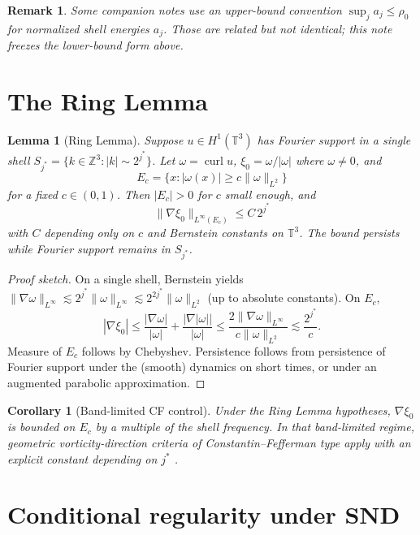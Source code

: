 \documentclass[11pt]{article}
\newtheorem{lemma}[theorem]{Lemma}
\newtheorem{corollary}[theorem]{Corollary}
\newtheorem{remark}[theorem]{Remark}
\begin{document}
\begin{remark}
Some companion notes use an upper-bound convention $\sup_j a_j\le\rho_0$ for normalized
shell energies $a_j$. Those are related but not identical; this note freezes the
lower-bound form above.
\end{remark}

\section{The Ring Lemma}

\begin{lemma}[Ring Lemma]
Suppose $u\in H^1(\mathbb{T}^3)$ has Fourier support in a single shell
$S_{j^*}=\{k\in\mathbb{Z}^3:|k|\sim 2^{j^*}\}$. Let $\omega=\operatorname{curl}u$,
$\xi_0=\omega/|\omega|$ where $\omega\neq 0$, and
\[
E_c=\{x:|\omega(x)|\ge c\|\omega\|_{L^2}\}
\]
for a fixed $c\in(0,1)$. Then $|E_c|>0$ for $c$ small enough, and
\[
\|\nabla\xi_0\|_{L^\infty(E_c)}\le C\,2^{j^*}
\]
with $C$ depending only on $c$ and Bernstein constants on $\mathbb{T}^3$.
The bound persists while Fourier support remains in $S_{j^*}$.
\end{lemma}

\begin{proof}[Proof sketch]
On a single shell, Bernstein yields
$\|\nabla\omega\|_{L^\infty}\lesssim 2^{j^*}\|\omega\|_{L^\infty}
\lesssim 2^{2j^*}\|\omega\|_{L^2}$ (up to absolute constants).
On $E_c$,
\[
|\nabla\xi_0|\le\frac{|\nabla\omega|}{|\omega|}
+\frac{|\nabla|\omega||}{|\omega|}
\le\frac{2\|\nabla\omega\|_{L^\infty}}{c\|\omega\|_{L^2}}
\lesssim\frac{2^{j^*}}{c}.
\]
Measure of $E_c$ follows by Chebyshev. Persistence follows from persistence of
Fourier support under the (smooth) dynamics on short times, or under an augmented
parabolic approximation.
\end{proof}

\begin{corollary}[Band-limited CF control]
Under the Ring Lemma hypotheses, $\nabla\xi_0$ is bounded on $E_c$ by a multiple of the
shell frequency. In that band-limited regime, geometric vorticity-direction criteria of
Constantin--Fefferman type apply with an explicit constant depending on $j^*$
\cite{CF1993}.
\end{corollary}

\section{Conditional regularity under SND}
\end{document}
